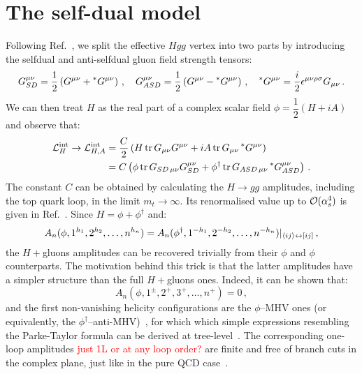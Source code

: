 \documentclass[main.tex]{subfiles}
\begin{document}
\section{The self-dual model}
Following Ref.~\cite{Dixon:2004za}, we split the effective $Hgg$ vertex into two parts by introducing the selfdual and anti-selfdual gluon field strength tensors:
\begin{equation}
    G^{\mu\nu}_{SD} = \frac{1}{2} \left(G^{\mu\nu} + \prescript{\ast}{}{G}^{\mu\nu} \right)\,, \quad     G^{\mu\nu}_{ASD} = \frac{1}{2} \left(G^{\mu\nu} - \prescript{\ast}{}{G}^{\mu\nu} \right)\,, \quad\prescript{\ast}{}{G}^{\mu\nu} = \frac{i}{2} \epsilon^{\mu\nu\rho\sigma} G_{\mu\nu}\,.
\end{equation}
We can then treat $H$ as the real part of a complex scalar field $\phi = \dfrac{1}{2}(H+i A)$ and observe that:
\begin{align}
    \mathcal{L}_H^{\text{int}} \rightarrow \mathcal{L}_{H, A}^{\text{int}} &= \frac{C}{2} \left( H \operatorname{\rm tr} {G}_{\mu\nu}{G}^{\mu\nu} + iA \operatorname{\rm tr} {G}_{\mu\nu}\prescript{\ast}{}{G}^{\mu\nu}\right) \\
    &= C \left( \phi \operatorname{\rm tr} {G}_{SD\,\mu\nu}{G}_{SD}^{\mu\nu} + \phi^\dagger \operatorname{\rm tr} {G}_{ASD\,\mu\nu}\prescript{\ast}{}{G}_{ASD}^{\mu\nu}\right)\,.
\end{align} 
The constant $C$ can be obtained by calculating the $H \rightarrow gg$ amplitudes, including the top quark loop, in the limit $m_t \rightarrow \infty$. Its renormalised value up to $\mathcal{O}(\alpha_s^4)$ is given in Ref.~\cite{Chetyrkin:1997iv}. Since $H = \phi + \phi^\dagger$ and:
\begin{equation}
    A_n(\phi, 1^{h_1},2^{h_2}, \ldots, n^{h_n}) = A_n(\phi^\dagger, 1^{-h_1},2^{-h_2}, \ldots, n^{-h_n}) \rvert_{\langle ij\rangle \leftrightarrow [ij]} \,,
\end{equation}
the $H+$gluons amplitudes can be recovered trivially from their $\phi$ and $\phi$ counterparts. The motivation behind this trick is that the latter amplitudes have a simpler structure than the full $H+$gluons ones. Indeed, it can be shown that: 
\begin{equation}
    A_n(\phi, 1^\pm,2^+,3^+, \ldots, n^+) = 0 \,,
\end{equation}
and the first non-vanishing helicity configurations are the $\phi$--MHV ones (or equivalently, the $\phi^\dagger$--anti-MHV)~\cite{Berends:1988759}, for which which simple expressions resembling the Parke-Taylor formula can be derived at tree-level~\cite{Dixon:2004za}. The corresponding one-loop amplitudes \textcolor{red}{just 1L or at any loop order?} are finite and free of branch cuts in the complex plane, just like in the pure QCD case~\cite{Mahlon:1993si}. 
\end{document}
